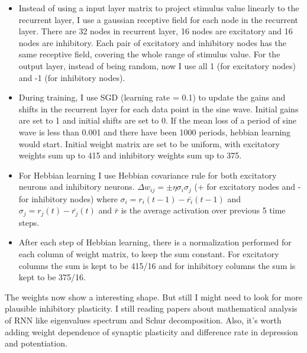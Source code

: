 \documentclass[12pt, a4paper]{article}
\begin{document}
\begin{itemize}
    \item Instead of using a input layer matrix to project stimulus value linearly to the recurrent layer, I use a gaussian receptive field for each node in the recurrent layer. There are 32 nodes in recurrent layer, 16 nodes are excitatory and 16 nodes are inhibitory. Each pair of excitatory and inhibitory nodes has the same receptive field, covering the whole range of stimulus value. For the output layer, instead of being random, now I use all 1 (for excitatory nodes) and -1 (for inhibitory nodes).
    \item During training, I use SGD (learning rate = 0.1) to update the gains and shifts in the recurrent layer for each data point in the sine wave. Initial gains are set to 1 and initial shifts are set to 0. If the mean loss of a period of sine wave is less than 0.001 and there have been 1000 periods, hebbian learning would start. Initial weight matrix are set to be uniform, with excitatory weights sum up to 415 and inhibitory weights sum up to 375.
    \item For Hebbian learning I use Hebbian covariance rule for both excitatory neurons and inhibitory neurons. $\Delta w_{ij} = \pm \eta \sigma_i \sigma_j$ (+ for excitatory nodes and - for inhibitory nodes) where $\sigma_i = r_i(t-1) - \bar{r_i}(t-1)$ and $\sigma_j = r_j(t) - \bar{r_j}(t)$ and $\bar{r}$ is the average activation over previous 5 time steps.
    \item After each step of Hebbian learning, there is a normalization performed for each column of weight matrix, to keep the sum constant. For excitatory columns the sum is kept to be 415/16 and for inhibitory columns the sum is kept to be 375/16.
\end{itemize}

The weights now show a interesting shape. But still I might need to look for more plausible inhibitory plasticity. I still reading papers about mathematical analysis of RNN like eigenvalues spectrum and Schur decomposition. Also, it's worth adding weight dependence of synaptic plasticity and difference rate in depression and potentiation.

\newpage
\end{document}
